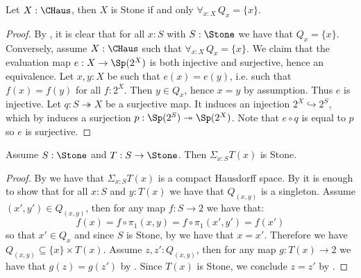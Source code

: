 \begin{lemma}\label{StoneCompactHausdorffTotallyDisconnected}
Let $X:\CHaus$, then $X$ is Stone if and only $\forall_{x:X}\, Q_x=\{x\}$.
\end{lemma}

\begin{proof}
  By , it is clear that for all $x:S$ with $S:\Stone$ we have that $Q_x=\{x\}$.
%
  Conversely, assume $X:\CHaus$ such that $\forall_{x:X}\, Q_x = \{x\}$.
  We claim that the evaluation map $e:X \to \Sp(2^X)$ is both injective and surjective, hence an equivalence. 
    Let $x,y:X$ be such that $e(x)=e(y)$, i.e. such that $f(x) = f(y)$ for all $f:2^X$. Then $y \in Q_x$, hence $x=y$ by assumption. Thus $e$ is injective. 
    Let $q:S\twoheadrightarrow X$ be a surjective map. 
    It induces an injection $2^X \hookrightarrow 2^S$, which by 
    induces a surjection $p:\Sp(2^S) \twoheadrightarrow \Sp(2^X)$. 
    Note that $e\circ q$ is equal to $p$ so $e$ is surjective. 
%
%
%
\end{proof}

\begin{theorem}
  \label{stone-sigma-closed}
Assume $S:\Stone$ and $T:S\to\Stone$. Then $\Sigma_{x:S}T(x)$ is Stone.
\end{theorem}

\begin{proof}
By  we have that $\Sigma_{x:S}T(x)$ is a compact Hausdorff space. 
By  
it is enough to show that for all $x:S$ and $y:T(x)$ 
we have that $Q_{(x,y)}$ is a singleton.
%
Assume $(x',y')\in Q_{(x,y)}$, then for any map $f:S\to 2$ we have that:
\[ f(x) = f\circ \pi_1(x,y) = f\circ \pi_1(x',y') = f(x')\]
so that $x'\in Q_x$ and since $S$ is Stone, by  we have that $x=x'$.
%
Therefore we have $Q_{(x,y)}\subseteq \{x\}\times T(x)$. 
Assume $z,z':Q_{(x,y)}$, then for any map $g:T(x)\to 2$ we have that $g(z)=g(z')$ by 
. Since $T(x)$ is Stone, 
we conclude $z=z'$ by .
\end{proof}


